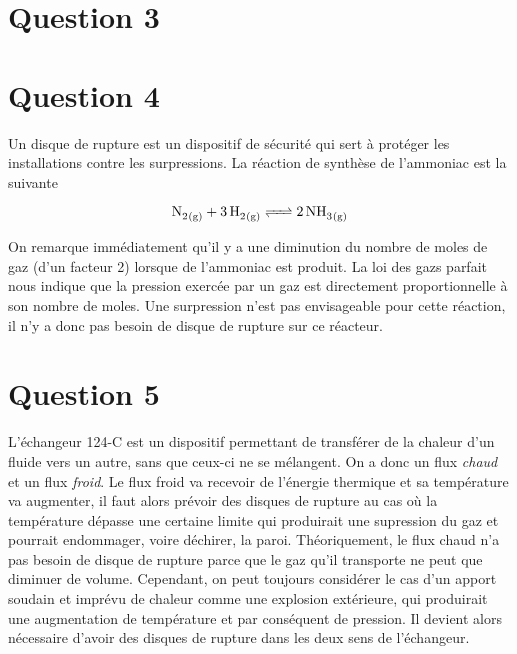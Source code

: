 \documentclass[a4paper,oneside,12pt]{article}
\begin{document}
\section*{Question 3}

\section*{Question 4}

Un disque de rupture est un dispositif de sécurité qui sert à protéger les installations 
contre les surpressions.
La réaction de synthèse de l'ammoniac est la suivante

\[
	\ce{N2_{(g)} + 3H2_{(g)} <=> 2NH3_{(g)}}
\]

On remarque immédiatement qu'il y a une diminution du nombre de moles de gaz (d'un facteur 2) 
lorsque de l'ammoniac est produit. La loi des gazs parfait nous indique que la pression
exercée par un gaz est directement proportionnelle à son nombre de moles.
Une surpression n'est pas envisageable pour cette réaction, 
il n'y a donc pas besoin de disque de rupture sur ce réacteur.

\section*{Question 5}

L'échangeur 124-C est un dispositif permettant de transférer de la chaleur d'un fluide
vers un autre, sans que ceux-ci ne se mélangent.
On a donc un flux \emph{chaud} et un flux \emph{froid}. Le flux froid va recevoir de 
l'énergie thermique et sa température va augmenter, il faut alors prévoir des disques 
de rupture au cas où la température dépasse une certaine limite qui produirait une 
supression du gaz et pourrait endommager, voire déchirer, la paroi.
Théoriquement, le flux chaud n'a pas besoin de disque de rupture parce que le gaz qu'il 
transporte ne peut que diminuer de volume. Cependant, on peut toujours considérer le cas
d'un apport soudain et imprévu de chaleur comme une explosion extérieure, qui produirait
une augmentation de température et par conséquent de pression. 
Il devient alors nécessaire d'avoir des disques de rupture dans les deux sens de l'échangeur.
\end{document}
